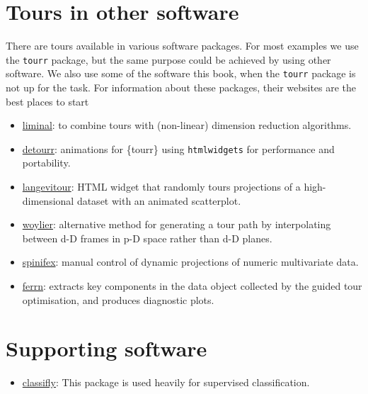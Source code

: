\documentclass[
  letterpaper,
]{krantz}
\providecommand{\tightlist}{%
  \setlength{\itemsep}{0pt}\setlength{\parskip}{0pt}}\usepackage{longtable,booktabs,array}
\begin{document}
\section{Tours in other software}\label{tours-in-other-software}

There are tours available in various software packages. For most
examples we use the \texttt{tourr} package, but the same purpose could
be achieved by using other software. We also use some of the software
this book, when the \texttt{tourr} package is not up for the task. For
information about these packages, their websites are the best places to
start

\begin{itemize}
\tightlist
\item
  \href{https://sa-lee.github.io/liminal/}{liminal}: to combine tours
  with (non-linear) dimension reduction algorithms.
\item
  \href{https://casperhart.github.io/detourr/}{detourr}: animations for
  \{tourr\} using \texttt{htmlwidgets} for performance and portability.
\item
  \href{https://logarithmic.net/langevitour/}{langevitour}: HTML widget
  that randomly tours projections of a high-dimensional dataset with an
  animated scatterplot.
\item
  \href{https://numbats.github.io/woylier/}{woylier}: alternative method
  for generating a tour path by interpolating between d-D frames in p-D
  space rather than d-D planes.
\item
  \href{https://nspyrison.github.io/spinifex/}{spinifex}: manual control
  of dynamic projections of numeric multivariate data.
\item
  \href{https://huizezhang-sherry.github.io/ferrn/}{ferrn}: extracts key
  components in the data object collected by the guided tour
  optimisation, and produces diagnostic plots.
\end{itemize}

\section{Supporting software}\label{supporting-software}

\begin{itemize}
\tightlist
\item
  \href{https://github.com/hadley/classifly}{classifly}: This package is
  used heavily for supervised classification.
\end{itemize}
\end{document}
